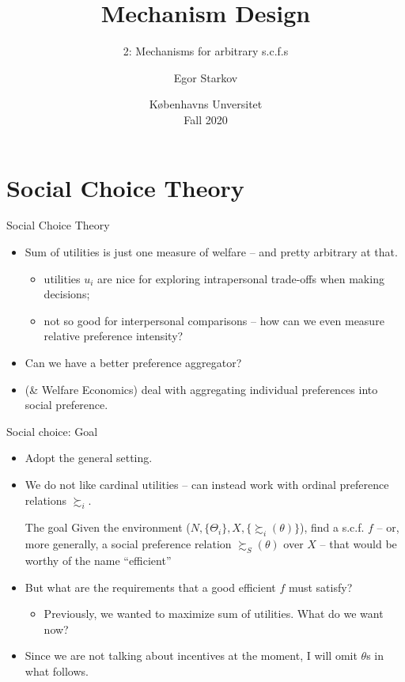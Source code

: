 \documentclass[english,10pt
,aspectratio=169
]{beamer}
\title{Mechanism Design}
\subtitle{2: Mechanisms for arbitrary s.c.f.s}
\author{Egor Starkov}
\date{K{\o}benhavns Unversitet \\
	Fall 2020}
\begin{document}
	\frame[plain]{\titlepage}



\section{Social Choice Theory}


\begin{frame}{Social Choice Theory}
\begin{itemize}
	\item Sum of utilities is just one measure of welfare -- and pretty arbitrary at that.
	\begin{itemize}
		\item utilities $u_i$ are nice for exploring \alert{intra}personal trade-offs when making decisions;
		\item not so good for \alert{inter}personal comparisons -- how can we even measure relative preference intensity?
	\end{itemize}
	\item Can we have a better preference aggregator?
	\item {} (\& Welfare Economics) deal with aggregating individual preferences into social preference.
\end{itemize}
\end{frame}


\begin{frame}{Social choice: Goal}
\begin{itemize}
	\item Adopt the \alert{general} setting.
	\item We do not like cardinal utilities -- can instead work with ordinal preference relations $\succsim_i$.
	\begin{exampleblock}{The goal}
		Given the environment ($N,\{\Theta_i\},X,\{\succsim_i(\theta)\}$), find a s.c.f. $f$ -- or, more generally, a social preference relation $\succsim_S(\theta)$ over $X$ -- that would be worthy of the name ``efficient''
	\end{exampleblock}
	\item But what are the requirements that a good efficient $f$ must satisfy?
	\begin{itemize}
		\item Previously, we wanted to maximize sum of utilities. What do we want now?
	\end{itemize}
	\item Since we are not talking about incentives at the moment, I will omit $\theta$s in what follows.
\end{itemize}
\end{frame}
\end{document}
